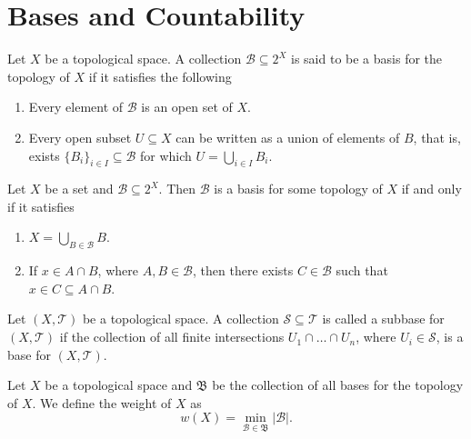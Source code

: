 \section{Bases and Countability}

\begin{definition}[Base]\label{def: base}
  Let \(X\) be a topological space. A collection \(\mathcal B \subseteq 2^X\) is
  said to be a basis for the topology of \(X\) if it satisfies the following
  \begin{enumerate}[(B1)]
    \item Every element of \(\mathcal B\) is an open set of \(X\).
    \item Every open subset \(U \subseteq X\) can be written as a union of
      elements of \(B\), that is, exists \(\{B_i\}_{i \in I} \subseteq \mathcal
      B\) for which \(U = \bigcup_{i \in  I} B_i\).
  \end{enumerate}
\end{definition}

\begin{proposition}
  Let \(X\) be a set and \(\mathcal B \subseteq 2^X\). Then \(\mathcal B\) is a
  basis for some topology of \(X\) if and only if it satisfies
  \begin{enumerate}[(1)]
    \item \(X = \bigcup_{B \in \mathcal B} B\).
    \item If \(x \in A \cap B\), where \(A, B \in \mathcal B\), then there
      exists \(C \in \mathcal B\) such that \(x \in C \subseteq A \cap B\).
  \end{enumerate}
\end{proposition}


\begin{definition}[Subbase]\label{def: subbase}
  Let \((X, \mathcal T)\) be a topological space. A collection \(\mathcal S
  \subseteq \mathcal T\) is called a subbase for \((X, \mathcal T)\) if the
  collection of all finite intersections \(U_1 \cap \dots \cap U_n\), where
  \(U_i \in \mathcal S\), is a base for \((X, \mathcal T)\).
\end{definition}

\begin{definition}[Weight]\label{def: weight}
  Let \(X\) be a topological space and \(\mathfrak B\) be the collection of
  all bases for the topology of \(X\). We define the weight of \(X\) as
  \[
    w(X) = \min_{\mathcal B \in \mathfrak B} |\mathcal B|.
  \]
\end{definition}

